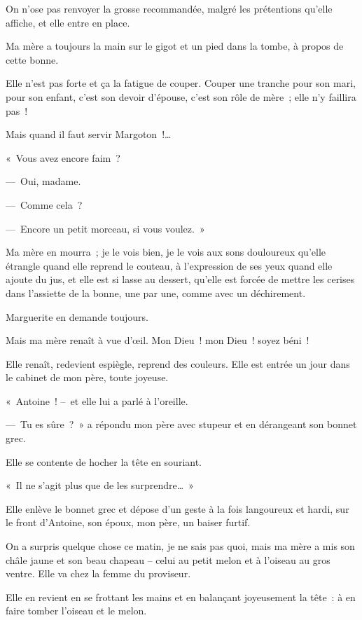 \documentclass[french,twoside]{book} %
\begin{document}
On n’ose pas renvoyer la grosse recommandée, malgré les prétentions qu’elle affiche, et elle entre en place.\par
\bigbreak
\noindent Ma mère a toujours la main sur le gigot et un pied dans la tombe, à propos de cette bonne.\par
Elle n’est pas forte et ça la fatigue de couper. Couper une tranche pour son mari, pour son enfant, c’est son devoir d’épouse, c’est son rôle de mère ; elle n’y faillira pas !\par
Mais quand il faut servir Margoton !…\par
« Vous avez encore faim ?\par
— Oui, madame.\par
— Comme cela ?\par
— Encore un petit morceau, si vous voulez. »\par
Ma mère en mourra ; je le vois bien, je le vois aux sons douloureux qu’elle étrangle quand elle reprend le couteau, à l’expression de ses yeux quand elle ajoute du jus, et elle est si lasse au dessert, qu’elle est forcée de mettre les cerises dans l’assiette de la bonne, une par une, comme avec un déchirement.\par
Marguerite en demande toujours.\par
\bigbreak
\noindent Mais ma mère renaît à vue d’œil. Mon Dieu ! mon Dieu ! soyez béni !\par
Elle renaît, redevient espiègle, reprend des couleurs. Elle est entrée un jour dans le cabinet de mon père, toute joyeuse.\par
« Antoine ! – et elle lui a parlé à l’oreille.\par
— Tu es sûre ? » a répondu mon père avec stupeur et en dérangeant son bonnet grec.\par
Elle se contente de hocher la tête en souriant.\par
« Il ne s’agit plus que de les surprendre… »\par
Elle enlève le bonnet grec et dépose d’un geste à la fois langoureux et hardi, sur le front d’Antoine, son époux, mon père, un baiser furtif.\par
On a surpris quelque chose ce matin, je ne sais pas quoi, mais ma mère a mis son châle jaune et son beau chapeau – celui au petit melon et à l’oiseau au gros ventre. Elle va chez la femme du proviseur.\par
Elle en revient en se frottant les mains et en balançant joyeusement la tête : à en faire tomber l’oiseau et le melon.\par
\end{document}
